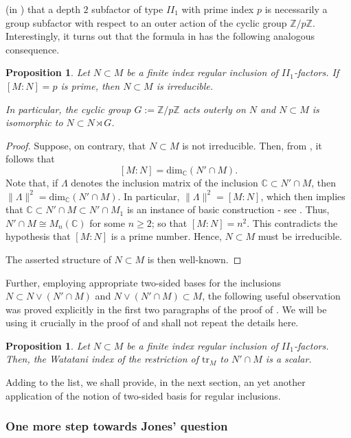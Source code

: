 \documentclass{amsart}
\newtheorem{proposition}[theorem]{Proposition}
\theoremstyle{definition}
\theoremstyle{theorem}
\newcommand{\C}{\mathbb{C}}
\newcommand{\tr}{\mathrm{tr}}
\newcommand{\Z}{\mathbb Z}
\begin{document}
(in \cite[Corollary 4.19]{NV1}) that a depth $2$ subfactor of type
$II_1$ with prime index $p$ is necessarily a group subfactor with
respect to an outer action of the cyclic group
$\Z/p\Z$. Interestingly, it turns out that the formula in
 has the following analogous consequence.
\begin{proposition}
Let $N \subset M$ be a finite index regular inclusion of
$II_1$-factors. If $[M:N]=p$ is prime, then $N\subset M$ is irreducible.

In particular, the
cyclic group $G:=\Z/p\Z$ acts outerly on $N$ and $N \subset M$ is
isomorphic to $N \subset N \rtimes G$.
\end{proposition}
\begin{proof}
  Suppose, on contrary, that $N\subset M$ is not irreducible. Then,
  from , it follows that
  \[
[M:N]= \mathrm{dim}_{\C}(N'\cap M).
  \]
Note that, if $\Lambda$ denotes the inclusion matrix of the inclusion
$\C \subset N'\cap M$, then $\|\Lambda\|^2 = \mathrm{dim}_{\C}(N'\cap
M)$. In particular, $\|\Lambda\|^2 = [M:N]$, which then implies that
$\C \subset N'\cap M \subset N'\cap M_1$ is an instance of basic
construction - see \cite[Theorem
  4.6.3 (vii)]{GHJ}. Thus, $N'\cap M \cong M_n(\C)$ for some $n \geq
2$; so that $[M:N]= n^2$. This contradicts the hypothesis that $[M:N]$
is a prime number. Hence, $N \subset M$ must be irreducible.


The asserted structure of $N \subset M$ is then well-known.\end{proof}


 Further, employing appropriate two-sided bases for the
inclusions $N \subset N \vee (N'\cap M)$ and $N \vee (N'\cap M)
\subset M$, the following useful observation was proved explicitly in
the first two paragraphs of the proof of \cite[Theorem 3.12]{BG}. We
will be using it crucially in the proof of  and shall not
repeat the details here.  

\begin{proposition}\cite{BG}\label{scalar-index}
Let $N \subset M$ be a finite index regular inclusion of $II_1$-factors. Then, 
 the Watatani index of the restriction of $\tr_M$ to $N'\cap M$ is a scalar.
\end{proposition}

Adding to the list, we shall provide, in the next
section, an yet another application of the notion of two-sided basis
for regular inclusions.\smallskip


\subsubsection{One more step towards Jones' question}\( \)
\end{document}
